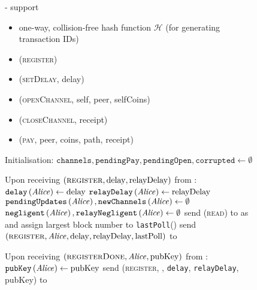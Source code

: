 \begin{figure}[!htbp]
  \begin{systembox}{\fpaynet - support}
      \begin{itemize}
        \item one-way, collision-free hash function $\mathcal{H}$ (for
        generating transaction IDs)
      \end{itemize}

      \begin{itemize}
        \item (\textsc{register})
        \item (\textsc{setDelay}, delay)
        \item (\textsc{openChannel}, self, peer, selfCoins)
        \item (\textsc{closeChannel}, receipt)
        \item (\textsc{pay}, peer, coins, path, receipt)
      \end{itemize}

    \begin{algorithmic}[1]
      \State Initialisation:
      \Indent
        \State $\mathtt{channels}, \mathtt{pendingPay}, \mathtt{pendingOpen},
        \mathtt{corrupted} \gets \emptyset$
      \EndIndent
      \State

      \State Upon receiving $\left(\textsc{register}, \mathrm{delay},
      \mathrm{relayDelay}\right)$ from \alice:
      \Indent
        \State $\mathtt{delay}\left(\mathit{Alice}\right) \gets \mathrm{delay}$
        \State $\mathtt{relayDelay}\left(\mathit{Alice}\right) \gets
        \mathrm{relayDelay}$
        \State $\mathtt{pendingUpdates}\left(\mathit{Alice}\right),
        \mathtt{newChannels}\left(\mathit{Alice}\right) \gets \emptyset$
        \State $\mathtt{negligent}\left(\mathit{Alice}\right),
        \mathtt{relayNegligent}\left(\mathit{Alice}\right) \gets \emptyset$
        \State send (\textsc{read}) to \ledger{} as \alice{} and assign largest
        block number to \texttt{lastPoll}(\alice)
        \label{alg:fpaynet:support:lastpoll}
        \State send $\left(\textsc{register}, \mathit{Alice}, \mathrm{delay},
        \mathrm{relayDelay}, \mathrm{lastPoll}\right)$ to \simulator
      \EndIndent
      \State

      \State Upon receiving $\left(\textsc{registerDone}, \mathit{Alice},
      \mathrm{pubKey}\right)$ from \simulator:
      \Indent
        \State $\mathtt{pubKey}\left(\mathit{Alice}\right) \gets \mathrm{pubKey}$
        \State send (\textsc{register}, \alice, \texttt{delay},
        \texttt{relayDelay}, pubKey) to \alice
      \EndIndent
      \State


\end{algorithmic}
\end{systembox}
\end{figure}
